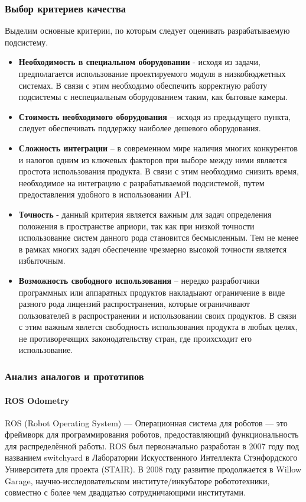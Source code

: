 \subsubsection{Выбор критериев качества}
Выделим основные критерии, по которым следует оценивать разрабатываемую подсистему.
\begin{itemize}
\item \textbf{Необходимость в специальном оборудовании} - исходя из задачи, предполагается использование проектируемого модуля в низкобюджетных системах. В связи с этим необходимо обеспечить корректную работу подсистемы с неспециальным оборудованием таким, как бытовые камеры. 
\item \textbf{Стоимость необходимого оборудования} – исходя из предыдущего пункта, следует обеспечивать поддержку наиболее дешевого оборудования. 
\item \textbf{Сложность интеграции} – в современном мире наличия многих конкурентов и налогов одним из ключевых факторов при выборе между ними является простота использования продукта. В связи с этим необходимо снизить время, необходимое на интеграцию с разрабатываемой подсистемой, путем предоставления удобного в использовании API.
\item \textbf{Точность} - данный критерия является важным для задач определения положения в пространстве априори, так как при низкой точности использование систем данного рода становится бесмысленным. Тем не менее в рамках многих задач обеспечение чрезмерно высокой точности является избыточным.
\item \textbf{Возможность свободного использования} – нередко разработчики программных или аппаратных продуктов накладыают ограничение в виде разного рода лицензий распространения, которые ограничивают пользователей в распространении и использовании своих продуктов. В связи с этим важным явлется свободность использования продукта в любых целях, не  противоречящих законодательству стран, где проихсходит его использование.
\end{itemize}

\subsubsection{Анализ аналогов и прототипов}

\paragraph{ROS Odometry}
ROS (Robot Operating System) — Операционная система для роботов — это фреймворк для программирования роботов, предоставляющий функциональность для распределённой работы. ROS был первоначально разработан в 2007 году под названием switchyard в Лаборатории Искусственного Интеллекта Стэнфордского Университета для проекта (STAIR). В 2008 году развитие продолжается в Willow Garage, научно-исследовательском институте/инкубаторе робототехники, совместно с более чем двадцатью сотрудничающими институтами.

